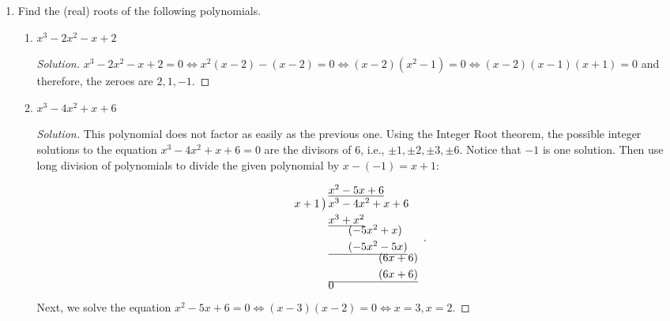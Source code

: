 \documentclass[12pt]{article}
\newenvironment{solution}{\begin{proof}[Solution]}{\end{proof}}
\begin{document}
\begin{enumerate}
\begin{enumerate}
			$
			g(x)=(a-1)x^2+(b+5)x+c.
			$
			
			\begin{solution}
				Two polynomials are equal if the corresponding coefficients are equal. We have
				$f(x)=2x^2-12x+18-4x-4=2x^2-16x+14$, so we get 
				$a-1=2, b+5=-16, c=14$, i.e. $a=3,b=-21,c=14$.
			\end{solution}
			
			\item $f(x)=(x-3)(2x^2-4x+5)+(x+2)(x^2-3x+1)$
			
			$g(x)=(a+b)x^3+(2a-c)x^2+(b+3c)x+11.
			$
			
			\begin{solution}
				We have $f(x)=2x^3-4x^2+5x-6x^2+12x-15+x^3-3x^2+x+2x^2-6x+2=3x^3-11x^2+12x-13$. Thus $a+b=3,2a-c=-11,b+3c=12$, i.e., $a=-\dfrac{24}{5},b=\dfrac{39}{5},c=\dfrac{7}{5}$.
			\end{solution}
		\end{enumerate}
		
		\item Find the (real) roots of the following polynomials.
		\begin{enumerate}
			\item $x^3-2x^2-x+2$
			\begin{solution}
				$x^3-2x^2-x+2=0 \iff x^2(x-2)-(x-2)=0\iff (x-2)(x^2-1)=0\iff (x-2)(x-1)(x+1)=0$ and therefore, the zeroes are $2,1,-1$.
			\end{solution}
			\item $x^3-4x^2+x+6$
			\begin{solution}
				This polynomial does not factor as easily as the previous one. Using the Integer Root theorem, the possible integer solutions to the equation $x^3-4x^2+x+6=0$ are the divisors of $6$, i.e., $\pm1,\pm2,\pm3,\pm6$. Notice that $-1$ is one solution. Then use long division of polynomials to divide the given polynomial by $x-(-1)=x+1$:
				
			$$
			\begin{array}{r@{}l}
				& \underline{x^2-5x+6} \\
				 x+1\,\big)\,& x^3-4x^2+x+6 \\[1mm]
				& \underline{x^3+x^2} \\[-1mm]
				& \phantom{x^3+}(-5x^2+x) \\[1mm]
				& \underline{\phantom{x^3+}(-5x^2-5x)} \\[-1mm]
				& \phantom{x^3-4x^2+}(6x+6) \\[1mm]
				& \underline{\phantom{x^3-4x^2+}(6x+6)} \\[-1mm]
				& 0
			\end{array}.
			$$
			Next, we solve the equation $x^2-5x+6=0\iff(x-3)(x-2)=0\iff x=3,x=2$.
			

\end{solution}
\end{enumerate}
\end{enumerate}
\end{document}
